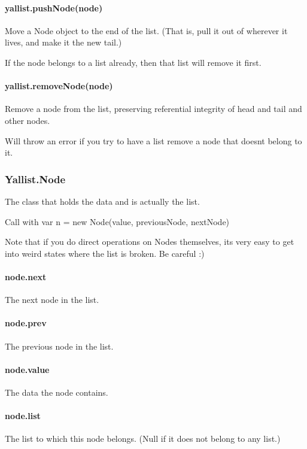 \paragraph*{yallist.\+push\+Node(node)}

Move a Node object to the end of the list. (That is, pull it out of wherever it lives, and make it the new tail.)

If the node belongs to a list already, then that list will remove it first.

\paragraph*{yallist.\+remove\+Node(node)}

Remove a node from the list, preserving referential integrity of head and tail and other nodes.

Will throw an error if you try to have a list remove a node that doesn\textquotesingle{}t belong to it.

\subsubsection*{Yallist.\+Node}

The class that holds the data and is actually the list.

Call with {\ttfamily var n = new Node(value, previous\+Node, next\+Node)}

Note that if you do direct operations on Nodes themselves, it\textquotesingle{}s very easy to get into weird states where the list is broken. Be careful \+:)

\paragraph*{node.\+next}

The next node in the list.

\paragraph*{node.\+prev}

The previous node in the list.

\paragraph*{node.\+value}

The data the node contains.

\paragraph*{node.\+list}

The list to which this node belongs. (Null if it does not belong to any list.) 